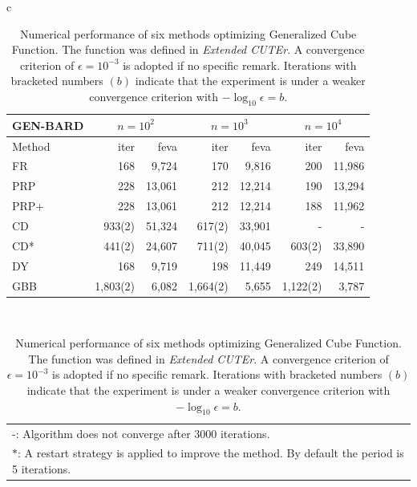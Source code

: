 \documentclass[11pt,a4paper]{article}
\begin{document}
\begin{table}
\label{tab3}
\centering
\begin{tabular}{c}
\begin{tabular}{l|rr|rr|rr}
\hline
\multicolumn{1}{c|}{\textbf{GEN-BARD}} & \multicolumn{2}{c|}{$n=10^2$} & \multicolumn{2}{c|}{$n=10^3$} & \multicolumn{2}{c}{$n=10^4$} \\
\hline
Method & iter & feva & iter & feva & iter & feva \\
\hline
FR & 168 & 9,724 & 170 & 9,816 & 200 & 11,986 \\
PRP & 228 & 13,061 & 212 & 12,214 & 190 & 13,294 \\
PRP+ & 228 & 13,061 & 212 & 12,214 & 188 & 11,962 \\
CD & 933(2) & 51,324 & 617(2) & 33,901 & - & - \\
CD* & 441(2) & 24,607 & 711(2) & 40,045 & 603(2) & 33,890 \\
DY & 168 & 9,719 & 198 & 11,449 & 249 & 14,511 \\
GBB & 1,803(2) & 6,082 & 1,664(2) & 5,655 & 1,122(2) & 3,787 \\
\hline
\end{tabular} \\
\begin{tabular}{l}
  -: Algorithm does not converge after 3000 iterations. \\
  $*$: A restart strategy is applied to improve the method. By default the period is 5 iterations. \\
\end{tabular}
\end{tabular}
\caption{Numerical performance of six methods optimizing Generalized Cube Function. The function was defined in \textit{Extended CUTEr}. A convergence criterion of $\epsilon=10^{-3}$ is adopted if no specific remark. Iterations with bracketed numbers $(b)$ indicate that the experiment is under a weaker convergence criterion with $-\log_{10}\epsilon=b$. }
\end{table}
\end{document}
